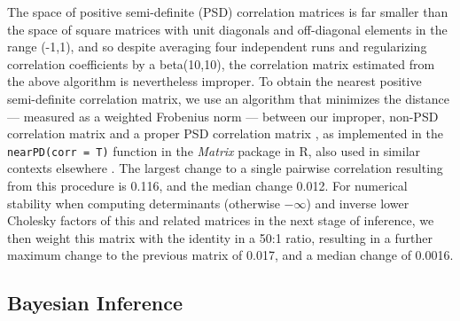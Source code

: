 \documentclass[10pt, twocolumn, twoside]{article}
\begin{document}
The space of positive semi-definite (PSD) correlation matrices is far smaller than the space of square matrices with unit diagonals and off-diagonal elements in the range (-1,1), and so despite averaging four independent runs and regularizing correlation coefficients by a beta(10,10), the correlation matrix estimated from the above algorithm is nevertheless improper. To obtain the nearest positive semi-definite correlation matrix, we use an algorithm that minimizes the distance --- measured as a weighted Frobenius norm --- between our improper, non-PSD correlation matrix and a proper PSD correlation matrix \citep{highamComputingNearestCorrelation2002}, as implemented in the \texttt{nearPD(corr = T)} function in the \textit{Matrix} package \citep{batesPackageMatrix2019} in R, also used in similar contexts elsewhere \citep{blowsPhenomewideDistributionGenetic2015}. The largest change to a single pairwise correlation resulting from this procedure is 0.116, and the median change 0.012.  For numerical stability when computing determinants (otherwise $-\infty$) and inverse lower Cholesky factors of this and related matrices in the next stage of inference, we then weight this matrix with the identity in a 50:1 ratio, resulting in a further maximum change to the previous matrix of 0.017, and a median change of 0.0016. 

\subsection{Bayesian Inference}
\end{document}

